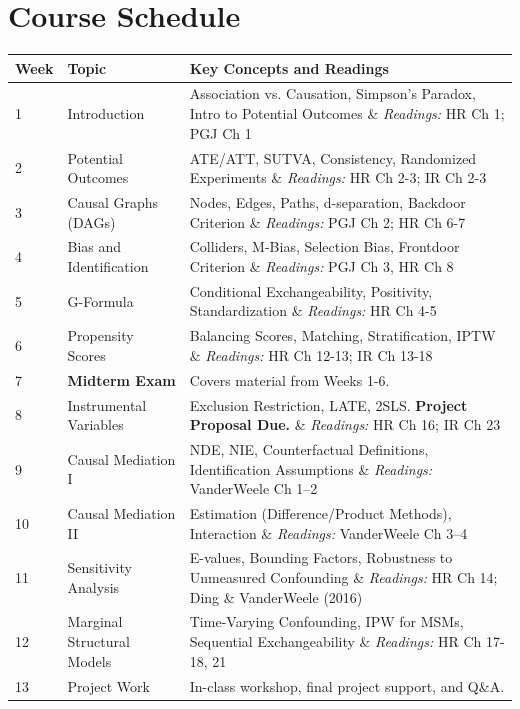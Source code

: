 \documentclass[11pt]{article}
\begin{document}
\section*{Course Schedule}
\begin{center}
  \small
  \begin{longtable}{p{}p{}p{}}
    \toprule
    \textbf{Week} & \textbf{Topic} & \textbf{Key Concepts and Readings} \\
    \midrule
    \endhead
    \endhead
    1 & Introduction & Association vs. Causation, Simpson's Paradox, Intro to Potential Outcomes \& \textit{Readings:} HR Ch 1; PGJ Ch 1 \\
    \midrule
    2 & Potential Outcomes & ATE/ATT, SUTVA, Consistency, Randomized Experiments \& \textit{Readings:} HR Ch 2-3; IR Ch 2-3 \\
    \midrule
    3 & Causal Graphs (DAGs) & Nodes, Edges, Paths, d-separation, Backdoor Criterion \& \textit{Readings:} PGJ Ch 2; HR Ch 6-7 \\
    \midrule
    4 & Bias and Identification & Colliders, M-Bias, Selection Bias, Frontdoor Criterion \& \textit{Readings:} PGJ Ch 3, HR Ch 8 \\
    \midrule
    5 & G-Formula & Conditional Exchangeability, Positivity, Standardization \& \textit{Readings:} HR Ch 4-5 \\
    \midrule
    6 & Propensity Scores & Balancing Scores, Matching, Stratification, IPTW \& \textit{Readings:} HR Ch 12-13; IR Ch 13-18 \\
    \midrule
    7 & \textbf{Midterm Exam} & Covers material from Weeks 1-6. \\
    \midrule
    8 & Instrumental Variables & Exclusion Restriction, LATE, 2SLS\@. \textbf{Project Proposal Due\@.} \& \textit{Readings:} HR Ch 16; IR Ch 23 \\
    \midrule
    9 & Causal Mediation I & NDE, NIE, Counterfactual Definitions, Identification Assumptions \& \textit{Readings:} VanderWeele Ch 1--2 \\
    \midrule
    10 & Causal Mediation II & Estimation (Difference/Product Methods), Interaction \& \textit{Readings:} VanderWeele Ch 3--4 \\
    \midrule
    11 & Sensitivity Analysis & E-values, Bounding Factors, Robustness to Unmeasured Confounding \& \textit{Readings:} HR Ch 14; Ding \& VanderWeele (2016) \\
    \midrule
    12 & Marginal Structural Models & Time-Varying Confounding, IPW for MSMs, Sequential Exchangeability \& \textit{Readings:} HR Ch 17-18, 21 \\
    \midrule
    13 & Project Work & In-class workshop, final project support, and Q\&A. \\
    \midrule
    \bottomrule
  \end{longtable}
  \normalsize
\end{center}
\end{document}
